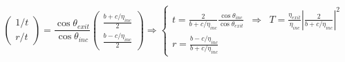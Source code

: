 \documentclass[a4paper,english]{article}
\begin{document}
\begin{dmath}
\begin{pmatrix}1/t \\ r/t \end{pmatrix} =  \frac{\cos \theta_{exit}}{\cos \theta_{inc}} \begin{pmatrix} \frac{b + c / \eta_{inc}}{2} \\ \frac{b - c / \eta_{inc}}{2} \end{pmatrix} \Rightarrow
\left\{ \begin{array}{lll}
	t = \frac{2}{b + c / \eta_{inc}} \frac{\cos \theta_{inc}}{\cos \theta_{exit}}  &\Rightarrow & T = \frac{\eta_{exit}}{\eta_{inc}} \left| \frac{2}{b + c / \eta_{inc}} \right|^2\\
	r = \frac{b - c / \eta_{inc}}{b + c / \eta_{inc}}
\end{array} \right.
\end{dmath}
\end{document}
